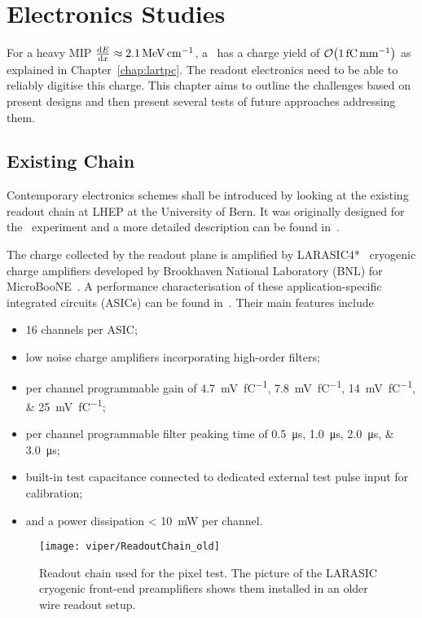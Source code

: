 \chapter{Electronics Studies}
\label{chap:electronics}

For a heavy MIP $\dv{E}{x} \approx \SI{2.1}{\mega\electronvolt\per\centi\metre}$, a \lartpc\ has a charge yield of $\order{\SI{1}{\femto\coulomb\per\milli\metre}}$ as explained in Chapter~\ref{chap:lartpc}.
The readout electronics need to be able to reliably digitise this charge.
This chapter aims to outline the challenges based on present designs and then present several tests of future approaches addressing them.

\section{Existing Chain}
\label{sec:electronics_existing}
Contemporary electronics schemes shall be introduced by looking at the existing readout chain at LHEP at the University of Bern.
It was originally designed for the \AT\ experiment and a more detailed description can be found in~\cite{AT_larasic}.

The charge collected by the readout plane is amplified by LARASIC4*~\cite{larasic} cryogenic charge amplifiers developed by Brookhaven National Laboratory (BNL) for MicroBooNE~\cite{uboone}.
A performance characterisation of these application-specific integrated circuits (ASICs) can be found in~\cite{AT_larasic}.
Their main features include

\begin{itemize}
	\item \num{16} channels per ASIC;
	\item low noise charge amplifiers incorporating high-order filters;
	\item per channel programmable gain of \SIlist[list-final-separator = { or }]{4.7; 7.8; 14; 25}{\milli\volt\per\femto\coulomb};
	\item per channel programmable filter peaking time of \SIlist[list-final-separator = { or }]{0.5; 1.0; 2.0; 3.0}{\micro\second};
	\item built-in test capacitance connected to dedicated external test pulse input for calibration;
	\item and a power dissipation \SI{< 10}{\milli\watt} per channel.
\end{itemize}

\begin{figure}[htb]
	\centering
	\texttt{[image: viper/ReadoutChain\_old]}
	\caption{Readout chain used for the pixel test. The picture of the LARASIC cryogenic front-end preamplifiers shows them installed in an older wire readout setup.~\cite{AT_larasic}}
	\label{fig:viper_readoutChain_old}
\end{figure}

